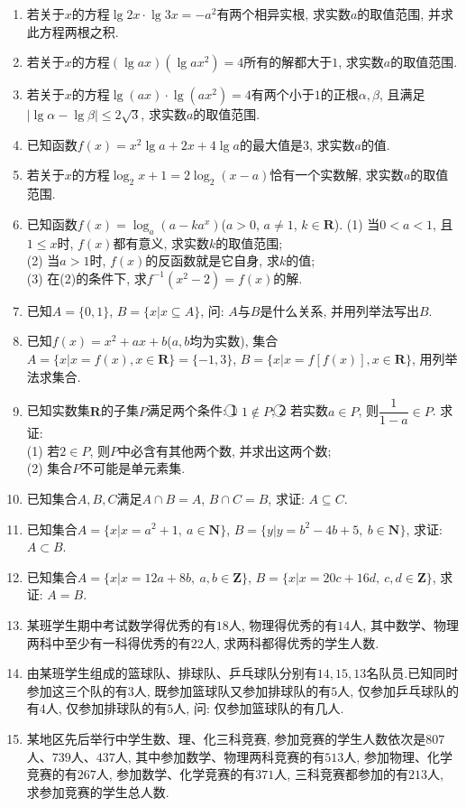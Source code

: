 \documentclass[10pt,a4paper]{article}
\begin{document}
\begin{enumerate}[1.]
\item 若关于$x$的方程$\lg 2x\cdot \lg 3x=-a^2$有两个相异实根, 求实数$a$的取值范围, 并求此方程两根之积.
\item 若关于$x$的方程$(\lg ax)(\lg ax^2)=4$所有的解都大于$1$, 求实数$a$的取值范围.
\item 若关于$x$的方程$\lg (ax)\cdot \lg (ax^2)=4$有两个小于$1$的正根$\alpha ,\beta$, 且满足$|\lg \alpha -\lg \beta|\le 2\sqrt 3$, 求实数$a$的取值范围.
\item 已知函数$f(x)=x^2\lg a+2x+4\lg a$的最大值是$3$, 求实数$a$的值.
\item 若关于$x$的方程$\log_2x+1=2\log_2(x-a)$恰有一个实数解, 求实数$a$的取值范围.
\item 已知函数$f(x)=\log_a(a-ka^x)$($a>0$, $a\ne 1$, $k\in \mathbf{R}$).
(1) 当$0<a<1$, 且$1\le x$时, $f(x)$都有意义, 求实数$k$的取值范围;\\
(2) 当$a>1$时, $f(x)$的反函数就是它自身, 求$k$的值;\\
(3) 在(2)的条件下, 求$f^{-1}(x^2-2)=f(x)$的解.
\item 已知$A=\{0,1\}$, $B=\{x|x\subseteq A\}$, 问: $A$与$B$是什么关系, 并用列举法写出$B$.
\item 已知$f(x)=x^2+ax+b$($a,b$均为实数), 集合$A=\{x|x=f(x) ,x\in \mathbf{R}\}=\{-1,3\}$, $B=\{x|x=f[f(x)],x\in \mathbf{R}\}$, 用列举法求集合.
\item 已知实数集$\mathbf{R}$的子集$P$满足两个条件: \textcircled{1} $1\notin P$; \textcircled{2} 若实数$a\in P$, 则$\dfrac 1{1-a}\in P$. 求证:\\
(1) 若$2\in P$, 则$P$中必含有其他两个数, 并求出这两个数;\\
(2) 集合$P$不可能是单元素集.
\item 已知集合$A,B,C$满足$A\cap B=A$, $B\cap C=B$, 求证: $A\subseteq C$.
\item 已知集合$A=\{x|x=a^2+1,\ a\in \mathbf{N}\}$, $B=\{y|y=b^2-4b+5,\ b\in \mathbf{N}\}$, 求证: $A\subset B$.
\item 已知集合$A=\{x|x=12a+8b,\ a,b\in \mathbf{Z}\}$, $B=\{x|x=20c+16d,\ c,d\in \mathbf{Z}\}$, 求证: $A=B$.
\item 某班学生期中考试数学得优秀的有$18$人, 物理得优秀的有$14$人, 其中数学、物理两科中至少有一科得优秀的有$22$人, 求两科都得优秀的学生人数.
\item 由某班学生组成的篮球队、排球队、乒乓球队分别有$14, 15, 13$名队员.已知同时参加这三个队的有$3$人, 既参加篮球队又参加排球队的有$5$人, 仅参加乒乓球队的有$4$人, 仅参加排球队的有$5$人, 问: 仅参加篮球队的有几人.
\item 某地区先后举行中学生数、理、化三科竞赛, 参加竞赛的学生人数依次是$807$人、$739$人、$437$人, 其中参加数学、物理两科竞赛的有$513$人, 参加物理、化学竞赛的有$267$人, 参加数学、化学竞赛的有$371$人, 三科竞赛都参加的有$213$人, 求参加竞赛的学生总人数.

\end{enumerate}
\end{document}
